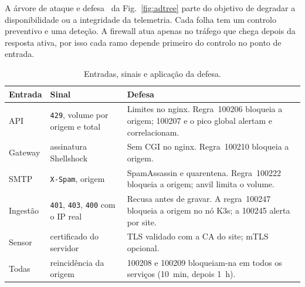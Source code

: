 \documentclass[conference,a4paper]{IEEEtran}
\newcommand{\code}[1]{\texttt{\small #1}}
\begin{document}
A árvore de ataque e defesa~\cite{adtree} da Fig.~\ref{fig:adtree} parte do objetivo de degradar a disponibilidade ou a integridade da telemetria. Cada folha tem um controlo preventivo e uma deteção. A firewall atua apenas no tráfego que chega depois da resposta ativa, por isso cada ramo depende primeiro do controlo no ponto de entrada.

\begin{table}[!t]
\centering
\caption{Entradas, sinais e aplicação da defesa.}
\label{tab:defesas}
\begin{tabular}{@{}p{}p{}p{}@{}}
\toprule
Entrada & Sinal & Defesa \\
\midrule
API & \code{429}, volume por origem e total & Limites no nginx. Regra~100206 bloqueia a origem; 100207 e o pico global alertam e correlacionam. \\
Gateway & assinatura Shellshock & Sem CGI no nginx. Regra~100210 bloqueia a origem. \\
SMTP & \code{X-Spam}, origem & SpamAssassin e quarentena. Regra~100222 bloqueia a origem; anvil limita o volume. \\
Ingestão & \code{401}, \code{403}, \code{400} com o IP real & Recusa antes de gravar. A regra~100247 bloqueia a origem no nó K3s; a 100245 alerta por site. \\
Sensor & certificado do servidor & TLS validado com a CA do site; mTLS opcional. \\
Todas & reincidência da origem & 100208 e 100209 bloqueiam-na em todos os serviços (10~min, depois 1~h). \\
\bottomrule
\end{tabular}
\end{table}
\end{document}
